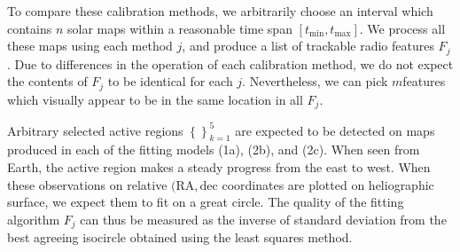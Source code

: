 \documentclass{aa}
\newcommand{\s}[2]{{#1}_{\mathrm{#2}}}
\begin{document}
  To compare these calibration methods, we arbitrarily choose an interval which contains $n$ solar maps within a 
  reasonable time span $[\s{t}{min},\s{t}{max}]$. We process all these maps using each method $j$, and produce a list of 
  trackable radio features $F_j$. Due to differences in the operation of each calibration method, we do not expect the 
  contents of $F_j$ to be identical for each $j$. Nevertheless, we can pick $m$features which visually appear to be in 
  the same location in all $F_j$.
  
  Arbitrary selected active regions $\left\{ \right\}_{k=1}^{5}$ are expected to be detected on maps produced in each of 
  the fitting models (1a), (2b), and (2c). When seen from Earth, the active region makes a steady progress from 
  the east 
  to west. When these observations on relative $(\mathrm{RA}, \mathrm{dec}$ coordinates are plotted on heliographic 
  surface, we expect them to fit on a great
  circle. The quality of the fitting algorithm $F_j$ can thus be measured as the 
  inverse of standard deviation from the best agreeing isocircle obtained using the 
  least squares method.
\end{document}
